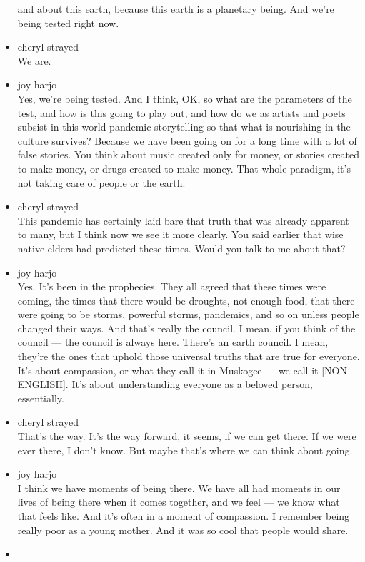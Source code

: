 \begin{itemize}
  and about this earth, because this earth is a planetary being. And
  we're being tested right now.
\item
  cheryl strayed\\
  We are.
\item
  joy harjo\\
  Yes, we're being tested. And I think, OK, so what are the parameters
  of the test, and how is this going to play out, and how do we as
  artists and poets subsist in this world pandemic storytelling so that
  what is nourishing in the culture survives? Because we have been going
  on for a long time with a lot of false stories. You think about music
  created only for money, or stories created to make money, or drugs
  created to make money. That whole paradigm, it's not taking care of
  people or the earth.
\item
  cheryl strayed\\
  This pandemic has certainly laid bare that truth that was already
  apparent to many, but I think now we see it more clearly. You said
  earlier that wise native elders had predicted these times. Would you
  talk to me about that?
\item
  joy harjo\\
  Yes. It's been in the prophecies. They all agreed that these times
  were coming, the times that there would be droughts, not enough food,
  that there were going to be storms, powerful storms, pandemics, and so
  on unless people changed their ways. And that's really the council. I
  mean, if you think of the council --- the council is always here.
  There's an earth council. I mean, they're the ones that uphold those
  universal truths that are true for everyone. It's about compassion, or
  what they call it in Muskogee --- we call it {[}NON-ENGLISH{]}. It's
  about understanding everyone as a beloved person, essentially.
\item
  cheryl strayed\\
  That's the way. It's the way forward, it seems, if we can get there.
  If we were ever there, I don't know. But maybe that's where we can
  think about going.
\item
  joy harjo\\
  I think we have moments of being there. We have all had moments in our
  lives of being there when it comes together, and we feel --- we know
  what that feels like. And it's often in a moment of compassion. I
  remember being really poor as a young mother. And it was so cool that
  people would share.
\item

\end{itemize}
